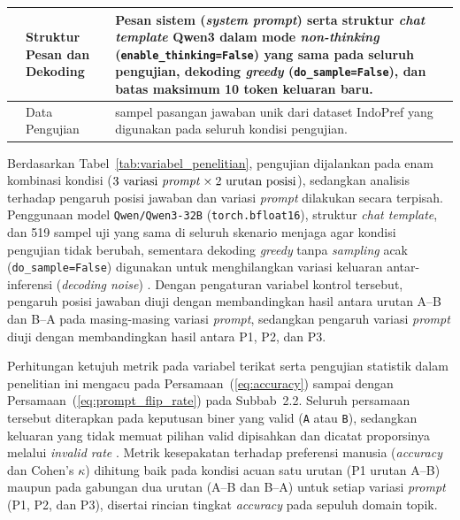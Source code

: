 \begin{table}[H]
{\begin{tabular}{|>{\raggedright\arraybackslash}p{2.15cm}|>{\raggedright\arraybackslash}p{3.15cm}|>{\raggedright\arraybackslash}p{7.55cm}|}
    \cline{2-3}
     & Struktur Pesan dan Dekoding & Pesan sistem (\textit{system prompt}) serta struktur \textit{chat template} Qwen3 dalam mode \textit{non-thinking} (\texttt{enable\_thinking=False}) yang sama pada seluruh pengujian, dekoding \textit{greedy} (\texttt{do\_sample=False}), dan batas maksimum 10 token keluaran baru. \\
    \cline{2-3}
     & Data Pengujian & 519 sampel pasangan jawaban unik dari dataset IndoPref yang digunakan pada seluruh kondisi pengujian. \\
    \hline
  \end{tabular}
  }
\end{table}

Berdasarkan Tabel~\ref{tab:variabel_penelitian}, pengujian dijalankan pada enam kombinasi kondisi ($3 \text{ variasi \textit{prompt}} \times 2 \text{ urutan posisi}$), sedangkan analisis terhadap pengaruh posisi jawaban dan variasi \textit{prompt} dilakukan secara terpisah. Penggunaan model \texttt{Qwen/\allowbreak Qwen3-\allowbreak 32B} (\texttt{torch.bfloat16}), struktur \textit{chat template}, dan 519 sampel uji yang sama di seluruh skenario menjaga agar kondisi pengujian tidak berubah, sementara dekoding \textit{greedy} tanpa \textit{sampling} acak (\texttt{do\_sample=False}) digunakan untuk menghilangkan variasi keluaran antar-inferensi (\textit{decoding noise}) \cite{shiJudgingJudgesSystematic}\cite{normanReliabilityValiditySystematic2026}. Dengan pengaturan variabel kontrol tersebut, pengaruh posisi jawaban diuji dengan membandingkan hasil antara urutan A--B dan B--A pada masing-masing variasi \textit{prompt}, sedangkan pengaruh variasi \textit{prompt} diuji dengan membandingkan hasil antara P1, P2, dan P3.

Perhitungan ketujuh metrik pada variabel terikat serta pengujian statistik dalam penelitian ini mengacu pada Persamaan~(\ref{eq:accuracy}) sampai dengan Persamaan~(\ref{eq:prompt_flip_rate}) pada Subbab~2.2. Seluruh persamaan tersebut diterapkan pada keputusan biner yang valid (\texttt{A} atau \texttt{B}), sedangkan keluaran yang tidak memuat pilihan valid dipisahkan dan dicatat proporsinya melalui \textit{invalid rate} \cite{raoAgreementMetricsLLMasJudge2026}. Metrik kesepakatan terhadap preferensi manusia (\textit{accuracy} dan Cohen's $\kappa$) dihitung baik pada kondisi acuan satu urutan (P1 urutan A--B) maupun pada gabungan dua urutan (A--B dan B--A) untuk setiap variasi \textit{prompt} (P1, P2, dan P3), disertai rincian tingkat \textit{accuracy} pada sepuluh domain topik.

